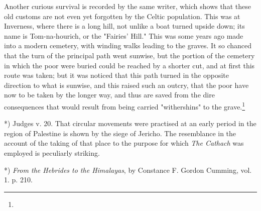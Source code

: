\documentclass[a4paper, 11pt, oneside, polutonikogreek, english]{article}
\begin{document}
Another curious survival is recorded by the same writer, which shows that these old customs are not even yet forgotten by the Celtic population. This was at Inverness, where there is a long hill, not unlike a boat turned upside down; its name is Tom-na-hourich, or the "Fairies' Hill." This was some years ago made into a modern cemetery, with winding walks leading to the graves. It so chanced that the turn of the principal path went sunwise, but the portion of the cemetery in which the poor were buried could be reached by a shorter cut, and at first this route was taken; but it was noticed that this path turned in the opposite direction to what is sunwise, and this raised such an outcry, that the poor have now to be taken by the longer way, and thus are saved from the dire consequences that would result from being carried "withershins" to the grave.\footnote{}

*) Judges v. 20. That circular movements were practised at an early period in the region of Palestine is shown by the siege of Jericho. The resemblance in the account of the taking of that place to the purpose for which \emph{The Cathach} was employed is peculiarly striking.

*) \emph{From the Hebrides to the Himalayas}, by Constance F. Gordon Cumming, vol. 1. p. 210.
\end{document}
